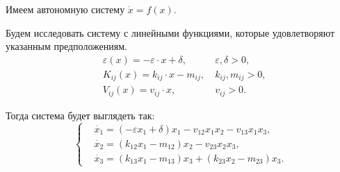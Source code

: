     Имеем автономную систему \( \dot{x} = f(x) \).

    Будем исследовать систему с линейными функциями, которые удовлетворяют указанным предположениям.
    \[
        \begin{split}
            & \varepsilon(x) = -\varepsilon \cdot x + \delta, & ~ \varepsilon, \delta > 0, \\
            & K_{ij} (x) = k_{ij} \cdot x - m_{ij}, & ~ k_{ij}, m_{ij} > 0, \\
            & V_{ij} (x) = v_{ij} \cdot x, & ~ v_{ij} > 0. 
        \end{split}
    \]

    Тогда система будет выглядеть так:
    \[
        \left\{\begin{split}
            & \dot{x_1} = \left( -\varepsilon x_1 + \delta \right)x_1 - v_{12} x_1 x_2 - v_{13} x_1 x_3, \\
            & \dot{x_2} = \left( k_{12} x_1 - m_{12} \right)x_2 - v_{23} x_2 x_3, \\
            & \dot{x_3} = \left( k_{13} x_1 - m_{13} \right)x_3 + \left( k_{23} x_2 - m_{23} \right)x_3. 
        \end{split}\right.
    \]